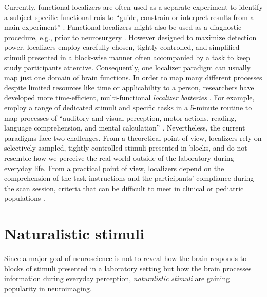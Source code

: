 Currently, functional localizers are often used as a separate experiment to
identify a subject-specific functional \acp{roi} to ``guide, constrain or
interpret results from a main experiment'' \citep{saxe2006divide}.
Functional localizers might also be used as a diagnostic procedure, e.g., prior
to neurosurgery \citep[cf.][]{wegrzyn2018thought}.
However designed to maximize detection power, localizers employ carefully
chosen, tightly controlled, and simplified stimuli presented in a block-wise
manner often accompanied by a task to keep study participants attentive.
Consequently, one localizer paradigm can usually map just one domain of brain
functions.
In order to map many different processes despite limited resources like time or
applicability to a person, researchers have developed more time-efficient,
multi-functional \textit{localizer batteries} \citep[e.g.,][]{barch2013function,
drobyshevsky2006rapid, pinho2018individual, pinho2020individual, pinel2007fast}.
For example, \citet{pinel2007fast} employ a range of dedicated stimuli and
specific tasks in a 5-minute routine to map processes of ``auditory and visual
perception, motor actions, reading, language comprehension, and mental
calculation'' \citep{pinel2007fast}.
Nevertheless, the current paradigms face two challenges.
From a theoretical point of view, localizers rely on selectively sampled,
tightly controlled stimuli presented in blocks, and do not resemble how we
perceive the real world outside of the laboratory during everyday life.
From a practical point of view, localizers depend on the comprehension of the
task instructions and the participants' compliance during the scan session,
criteria that can be difficult to meet in clinical or pediatric populations
\citep{eickhoff2020towards, vanderwal2015inscapes, vanderwal2019movies}.


\section{Naturalistic stimuli}
Since a major goal of neuroscience is not to reveal how the brain responds to
blocks of stimuli presented in a laboratory setting but how the brain processes
information during everyday perception, \textit{naturalistic stimuli} are
gaining popularity in neuroimaging.


